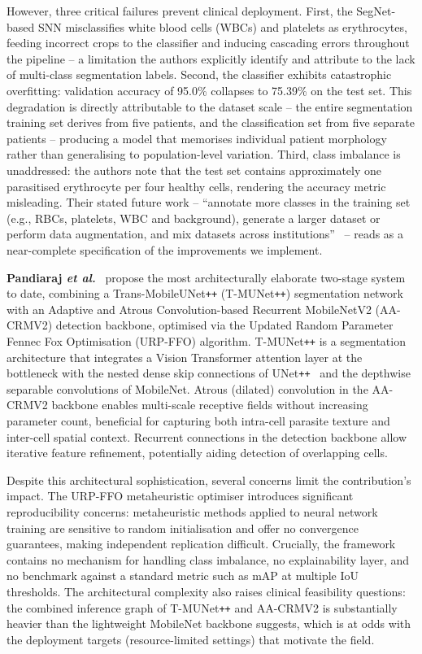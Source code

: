 \documentclass[10pt,twocolumn]{article}
\newcommand{\etal}{\textit{et al.}}
\begin{document}
However, three critical failures prevent clinical deployment. First,
the SegNet-based SNN misclassifies white blood cells (WBCs) and platelets
as erythrocytes, feeding incorrect crops to the classifier and inducing
cascading errors throughout the pipeline -- a limitation the authors
explicitly identify and attribute to the lack of multi-class segmentation
labels. Second, the classifier exhibits catastrophic overfitting: validation
accuracy of 95.0\% collapses to 75.39\% on the test set. This degradation
is directly attributable to the dataset scale -- the entire segmentation
training set derives from five patients, and the classification set from
five separate patients -- producing a model that memorises individual patient
morphology rather than generalising to population-level variation. Third,
class imbalance is unaddressed: the authors note that the test set contains
approximately one parasitised erythrocyte per four healthy cells, rendering
the accuracy metric misleading. Their stated future work -- ``annotate more
classes in the training set (e.g., RBCs, platelets, WBC and background),
generate a larger dataset or perform data augmentation, and mix datasets
across institutions''~\cite{delgado2020} -- reads as a near-complete
specification of the improvements we implement.

\textbf{Pandiaraj \etal}~\cite{pandiaraj2024} propose the most
architecturally elaborate two-stage system to date, combining a
Trans-MobileUNet\texttt{++} (T-MUNet\texttt{++}) segmentation network
with an Adaptive and Atrous Convolution-based Recurrent MobileNetV2
(AA-CRMV2) detection backbone, optimised via the Updated Random
Parameter Fennec Fox Optimisation (URP-FFO) algorithm.
T-MUNet\texttt{++} is a segmentation architecture that integrates a
Vision Transformer attention layer at the bottleneck with the nested
dense skip connections of UNet\texttt{++}~\cite{zhou2018unetpp} and the
depthwise separable convolutions of MobileNet. Atrous (dilated)
convolution in the AA-CRMV2 backbone enables multi-scale receptive
fields without increasing parameter count, beneficial for capturing
both intra-cell parasite texture and inter-cell spatial context.
Recurrent connections in the detection backbone allow iterative feature
refinement, potentially aiding detection of overlapping cells.

Despite this architectural sophistication, several concerns limit the
contribution's impact. The URP-FFO metaheuristic optimiser introduces
significant reproducibility concerns: metaheuristic methods applied to
neural network training are sensitive to random initialisation and offer
no convergence guarantees, making independent replication difficult.
Crucially, the framework contains no mechanism for handling class imbalance,
no explainability layer, and no benchmark against a standard metric such
as mAP at multiple IoU thresholds. The architectural complexity also
raises clinical feasibility questions: the combined inference graph
of T-MUNet\texttt{++} and AA-CRMV2 is substantially heavier than the
lightweight MobileNet backbone suggests, which is at odds with the
deployment targets (resource-limited settings) that motivate the field.
\end{document}
